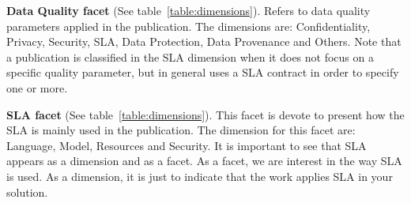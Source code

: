 \textbf{Data Quality facet} (See table~\ref{table:dimensions}). 
Refers to data quality parameters applied in the publication. 
The dimensions are: Confidentiality, Privacy, Security, SLA, Data Protection, Data Provenance and Others.
Note that a publication is classified in the SLA dimension when it does not focus on a specific quality parameter, but in general uses a SLA contract in order to specify one or more.

\textbf{SLA facet} (See table~\ref{table:dimensions}).
This facet is devote to present how the SLA is mainly used in the publication. 
The dimension for this facet are: Language, Model, Resources and Security.
It is important to see that SLA appears as a dimension and as a facet.
As a facet, we are interest in the way SLA is used. 
As a dimension, it is just to indicate that the work
applies SLA in your solution.

